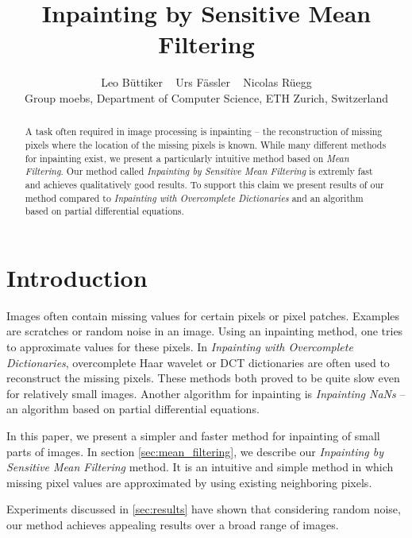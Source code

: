 \documentclass[10pt,conference,compsocconf]{IEEEtran}
\begin{document}
\title{Inpainting by Sensitive Mean Filtering}

\author{
  Leo Büttiker \mbox{    }  Urs Fässler \mbox{     } Nicolas Rüegg \\
  Group moebs, Department of Computer Science, ETH Zurich, Switzerland

}

\maketitle

\begin{abstract}
  A task often required in image processing is inpainting -- the reconstruction of missing pixels where the location of the missing pixels is known. While many different methods for inpainting exist, we present a particularly intuitive method based on \emph{Mean Filtering}. Our method called \emph{Inpainting by Sensitive Mean Filtering} is extremly fast and achieves qualitatively good results. To support this claim we present results of our method compared to \emph{Inpainting with Overcomplete Dictionaries} and an algorithm based on partial differential equations.
\end{abstract}


\section{Introduction}
Images often contain missing values for certain pixels or pixel patches. Examples are scratches or random noise in an image.
Using an inpainting method, one tries to approximate values for these pixels. In \emph{Inpainting with Overcomplete Dictionaries}, overcomplete Haar wavelet or DCT dictionaries are often used to reconstruct the missing pixels. These methods both proved to be quite slow even for relatively small images. Another algorithm for inpainting is \emph{Inpainting NaNs} -- an algorithm based on partial differential equations.

In this paper, we present a simpler and faster method for inpainting of small parts of images. In section \ref{sec:mean_filtering}, we describe our \emph{Inpainting by Sensitive Mean Filtering} method. It is an intuitive and simple method in which missing pixel values are approximated by using existing neighboring pixels.

Experiments discussed in \ref{sec:results} have shown that considering random noise, our method achieves appealing results over a broad range of images.
\end{document}

